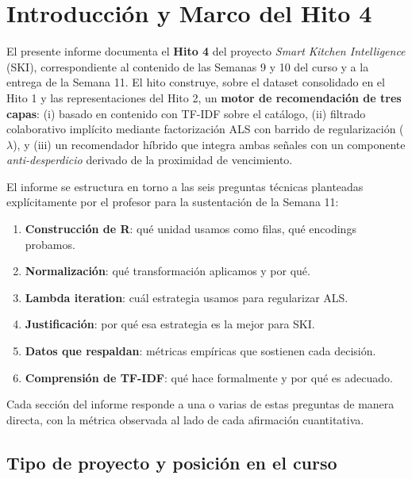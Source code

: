 \documentclass[12pt,a4paper]{article}
\begin{document}
\tableofcontents
\newpage

\section{Introducción y Marco del Hito 4}

El presente informe documenta el \textbf{Hito 4} del proyecto \textit{Smart Kitchen Intelligence} (SKI), correspondiente al contenido de las Semanas 9 y 10 del curso y a la entrega de la Semana 11. El hito construye, sobre el dataset consolidado en el Hito 1 y las representaciones del Hito 2, un \textbf{motor de recomendación de tres capas}: (i) basado en contenido con TF-IDF sobre el catálogo, (ii) filtrado colaborativo implícito mediante factorización ALS con barrido de regularización ($\lambda$), y (iii) un recomendador híbrido que integra ambas señales con un componente \textit{anti-desperdicio} derivado de la proximidad de vencimiento.

El informe se estructura en torno a las seis preguntas técnicas planteadas explícitamente por el profesor para la sustentación de la Semana 11:

\begin{enumerate}
    \item \textbf{Construcción de R}: qué unidad usamos como filas, qué encodings probamos.
    \item \textbf{Normalización}: qué transformación aplicamos y por qué.
    \item \textbf{Lambda iteration}: cuál estrategia usamos para regularizar ALS.
    \item \textbf{Justificación}: por qué esa estrategia es la mejor para SKI.
    \item \textbf{Datos que respaldan}: métricas empíricas que sostienen cada decisión.
    \item \textbf{Comprensión de TF-IDF}: qué hace formalmente y por qué es adecuado.
\end{enumerate}

Cada sección del informe responde a una o varias de estas preguntas de manera directa, con la métrica observada al lado de cada afirmación cuantitativa.

\subsection{Tipo de proyecto y posición en el curso}
\end{document}
